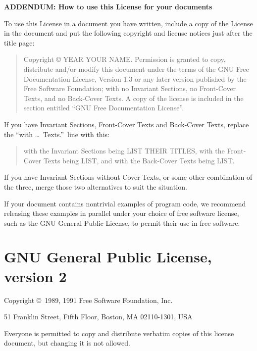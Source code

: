 \documentclass[a4paper,11pt,oneside]{book}
\begin{document}
\begin{center}
	{\Large\bf ADDENDUM: How to use this License for your documents\par}
\end{center}

To use this License in a document you have written, include a copy of
the License in the document and put the following copyright and
license notices just after the title page:

\bigskip
\begin{quote}
	Copyright \copyright{}  YEAR  YOUR NAME.
	Permission is granted to copy, distribute and/or modify this document
	under the terms of the GNU Free Documentation License, Version 1.3
	or any later version published by the Free Software Foundation;
	with no Invariant Sections, no Front-Cover Texts, and no Back-Cover Texts.
	A copy of the license is included in the section entitled ``GNU
	Free Documentation License''.
\end{quote}
\bigskip

If you have Invariant Sections, Front-Cover Texts and Back-Cover Texts,
replace the ``with \dots\ Texts.''\ line with this:

\bigskip
\begin{quote}
	with the Invariant Sections being LIST THEIR TITLES, with the
	Front-Cover Texts being LIST, and with the Back-Cover Texts being LIST.
\end{quote}
\bigskip

If you have Invariant Sections without Cover Texts, or some other
combination of the three, merge those two alternatives to suit the
situation.

If your document contains nontrivial examples of program code, we
recommend releasing these examples in parallel under your choice of
free software license, such as the GNU General Public License,
to permit their use in free software.

\chapter{GNU General Public License, version 2}

\begin{center}
	{\parindent 0in

		Copyright \copyright\ 1989, 1991 Free Software Foundation, Inc.

		\bigskip

		51 Franklin Street, Fifth Floor, Boston, MA  02110-1301, USA

		\bigskip

		Everyone is permitted to copy and distribute verbatim copies
		of this license document, but changing it is not allowed.
	}
\end{center}
\end{document}
